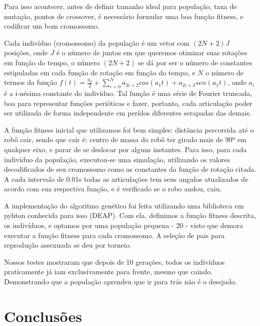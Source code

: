 \documentclass[twoside,conference,a4paper]{IEEEtran}
\begin{document}
Para isso acontecer, antes de definir tamanho ideal para população, taxa de mutação, pontos de crossover, é necessário formular uma boa função fitness, e codificar um bom cromossomo.


Cada indivíduo (cromossomo) da população é um vetor com $(2N+2)J$ posições, onde $J$ é o número de juntas em que queremos otimizar suas rotações em função do tempo, o número $(2N+2)$ se dá por ser o número de constantes estipuladas em cada função de rotação em função do tempo, e $N$ o número de termos da função $f(t) = \frac{a_0}{2}+\sum_{i=0}^N a_{2i+2} cos(a_{1} t) + a_{2i+3} sen(a_{1} t)$, onde $a_i$ é a i-nésima constante do indivíduo. Tal função é uma série de Fourier truncada, boa para representar funções perióticas e fazer, portanto, cada articulação poder ser utilizada de forma independente em perídos diferentes serapadas das demais.

A função fitness inicial que utilizamos foi bem simples: distância percorrida até o robô cair, sendo que cair é: centro de massa do robô ter girado mais de 90º em qualquer eixo, e parar de se deslocar por alguns instantes. Para isso, para cada indivíduo da população, executou-se uma simulação, utilizando os valores decodificados de seu cromossomo como as constantes da função de rotação citada. A cada intervalo de 0.01s todas as articulações tem seus angulos atualizados de acordo com sua respectiva função, e é verificado se o robo andou, caiu.

A implementação do algoritmo genético foi feita utilizando uma biblioteca em pyhton conhecida para isso (DEAP). Com ela, definimos a função fitness descrita, os indivíduos, e optamos por uma população pequena - 20 - visto que demora executar a função fitness para cada cromossomo. A seleção de pais para reprodução assexuada se deu por torneio.

Nossos testes mostraram que depois de 10 gerações, todos os indivíduos praticamente já iam exclusivamente para frente, mesmo que caindo. Demonstrando que a população aprendeu que ir para trás não é o desejado.

\section{Conclusões} \label{conclusoes}

\nocite{Aula}



\end{document}
